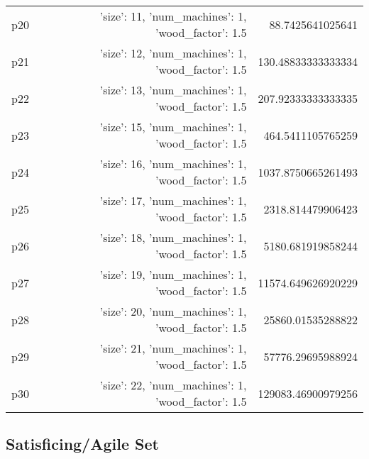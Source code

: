 \documentclass{article}
\begin{document}
\begin{center}
\begin{tabular}{r|r|r}
  p20&{'size': 11, 'num\_machines': 1, 'wood\_factor': 1.5}&88.7425641025641\\
  p21&{'size': 12, 'num\_machines': 1, 'wood\_factor': 1.5}&130.48833333333334\\
  p22&{'size': 13, 'num\_machines': 1, 'wood\_factor': 1.5}&207.92333333333335\\
  p23&{'size': 15, 'num\_machines': 1, 'wood\_factor': 1.5}&464.5411105765259\\
  p24&{'size': 16, 'num\_machines': 1, 'wood\_factor': 1.5}&1037.8750665261493\\
  p25&{'size': 17, 'num\_machines': 1, 'wood\_factor': 1.5}&2318.814479906423\\
  p26&{'size': 18, 'num\_machines': 1, 'wood\_factor': 1.5}&5180.681919858244\\
  p27&{'size': 19, 'num\_machines': 1, 'wood\_factor': 1.5}&11574.649626920229\\
  p28&{'size': 20, 'num\_machines': 1, 'wood\_factor': 1.5}&25860.01535288822\\
  p29&{'size': 21, 'num\_machines': 1, 'wood\_factor': 1.5}&57776.29695988924\\
  p30&{'size': 22, 'num\_machines': 1, 'wood\_factor': 1.5}&129083.46900979256
                            \end{tabular}
                            \end{center}
                    

                                \subsection*{Satisficing/Agile Set}
                                
\end{document}
